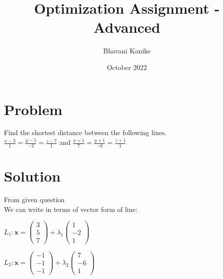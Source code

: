 \documentclass[journal,10pt,twocolumn]{article}
\title{\textbf{Optimization Assignment - Advanced}}
\author{Bhavani Kanike}
\date{October 2022}
\let\vec\mathbf
\newcommand{\myvec}[1]{\ensuremath{\begin{pmatrix}#1\end{pmatrix}}}
\begin{document}
\maketitle


\section*{Problem} Find the shortest distance between the following lines.\\
$\frac{x-3}{1} = \frac{y-5}{-2} = \frac{z-7}{1}$ and $\frac{x+1}{7} = \frac{y+1}{-6} = \frac{z+1}{1}$

\section*{Solution}
 From given question  \\
 We can write in terms of vector form of line:\\
\begin{center}
 	$L_1 : \vec{x} = \myvec{3\\5\\7} + \lambda_1\myvec{1\\-2\\1}$
\end{center}
\begin{center}
	$L_2 : \vec{x} = \myvec{-1\\-1\\-1} + \lambda_2\myvec{7\\-6\\1}$
\end{center}
\end{document}

